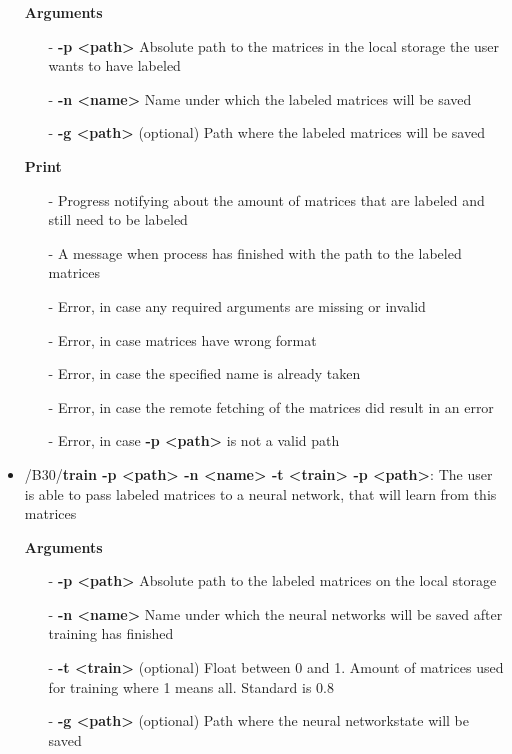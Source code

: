 \documentclass[parskip=full]{scrartcl}
\begin{document}
\begin{itemize}
\textbf{Arguments}
	\begin{itemize}
	\item[-]\textbf{-p <path>} Absolute path to the matrices in the local storage the user wants to have labeled
	\item[-]\textbf{-n <name>} Name under which the labeled matrices will be saved
	\item[-]\textbf{-g <path>} (optional) Path where the labeled matrices will be saved
	\end{itemize}

\textbf{Print}
	\begin{itemize}
	\item[-]Progress notifying about the amount of matrices that are labeled and still need to be labeled
	\item[-]A message when process has finished with the path to the labeled matrices
	\item[-]Error, in case any required arguments are missing or invalid
	\item[-]Error, in case matrices have wrong format
	\item[-]Error, in case the specified name is already taken
	\item[-]Error, in case the remote fetching of the matrices did result in an error
	\item[-]Error, in case \textbf{-p <path>} is not a valid path
	\end{itemize}

\item/B30/\textbf{train -p <path> -n <name> -t <train> -p <path>}:
\newline The user is able to pass labeled matrices to a \gls{neural network}, that will learn from this matrices

\textbf{Arguments}
	\begin{itemize}
	\item[-]\textbf{-p <path>} Absolute path to the labeled matrices on the local storage
	\item[-]\textbf{-n <name>} Name under which the \glspl{neural network} will be saved after training has finished
	\item[-]\textbf{-t <train>} (optional) Float between 0 and 1. Amount of matrices used for training where 1 means all. Standard is 0.8
	\item[-]\textbf{-g <path>} (optional) Path where the \gls{neural network}state will be saved
	\end{itemize}


\end{itemize}
\end{document}
